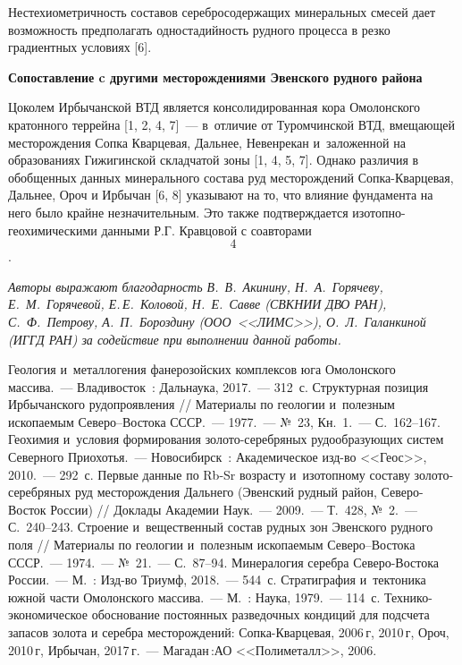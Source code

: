  Нестехиометричность составов серебросодержащих минеральных смесей дает
 возможность предполагать одностадийность рудного процесса в резко
 градиентных условиях [6].

\textbf{Сопоставление c другими месторождениями Эвенского рудного района}

Цоколем Ирбычанской ВТД является консолидированная кора Омолонского кратонного террейна [1, 2, 4, 7]~--- в~отличие от Туромчинской ВТД, вмещающей месторождения Сопка Кварцевая, Дальнее, Невенрекан и~заложенной на образованиях Гижигинской складчатой зоны [1, 4, 5, 7]. Однако различия в обобщенных данных минерального состава руд
месторождений Сопка-Кварцевая, Дальнее, Ороч и Ирбычан [6, 8] указывают на то, что влияние
фундамента на него было крайне незначительным. Это также подтверждается
изотопно-геохимическими данными Р.Г. Кравцовой с соавторами \[4\].

\textit{Авторы выражают благодарность В.~В.~Акинину,  Н.~А.~Горячеву, Е.~М.~Горячевой, Е.\,Е.~Коловой, Н.~Е.~Савве (СВКНИИ ДВО РАН), С.~Ф.~Петрову, А.~П.~Бороздину (ООО~<<ЛИМС>>), О.~Л.~Галанкиной (ИГГД РАН) за содействие при выполнении данной работы.}


\begin{thebibliography}{99}

\bibitem{}
 Геология и~металлогения фанерозойских комплексов юга Омолонского массива.~--- Владивосток~: Дальнаука, 2017.~--- 312~с.
\bibitem{}
 Структурная позиция Ирбычанского рудопроявления // Материалы по геологии и~полезным ископаемым Северо–Востока СССР.~--- 1977.~--- №~23, Кн.~1.~--- С.~162--167.
\bibitem{}
 Геохимия и~условия формирования золото-серебряных рудообразующих систем Северного Приохотья.~--- Новосибирск~: Академическое изд-во <<Геос>>, 2010.~--- 292~с.
\bibitem{}
 Первые данные по Rb-Sr возрасту и~изотопному составу золото-серебряных руд месторождения Дальнего (Эвенский рудный район, Северо-Восток России) // Доклады Академии Наук.~--- 2009.~--- Т.~428, №~2.~--- С.~240--243.
\bibitem{}
 Строение и~вещественный состав рудных зон Эвенского рудного поля // Материалы по геологии и~полезным ископаемым Северо–Востока СССР.~--- 1974.~--- №~21.~--- С.~87--94.
\bibitem{}
 Минералогия серебра Северо-Востока России.~--- М.~: Изд-во Триумф, 2018.~--- 544~с.
\bibitem{}
 Стратиграфия и~тектоника южной части Омолонского массива.~--- М.~: Наука, 1979.~--- 114~с.
\bibitem{}Технико-экономическое обоснование постоянных разведочных кондиций для подсчета запасов золота и серебра месторождений: Сопка-Кварцевая, 2006\,г, 2010\,г, Ороч, 2010\,г, Ирбычан, 2017\,г.~--- Магадан\,:АО <<Полиметалл>>, 2006.

\end{thebibliography}
